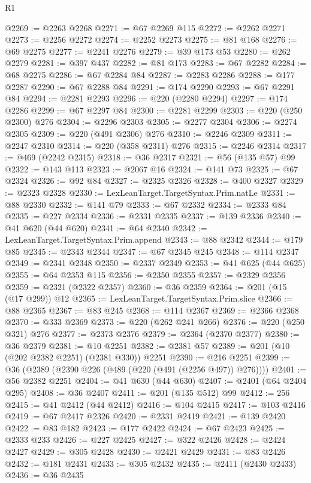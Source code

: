 \begin{lexlean}{R1}
\begin{coremodule}
{{{{{{{{{{{{{{{{{{{{{{{{{{{{{{{{{{{{{{{{@2269 := @2263 @2268
@2271 := @67 @2269 @115
@2272 := @2262 @2271
@2273 := @2256 @2272
@2274 := @2252 @2273
@2275 := @81 @168
@2276 := @69 @2275
@2277 := @2241 @2276
@2279 := @39 @173 @53
@2280 := @262 @2279
@2281 := @397 @437
@2282 := @81 @173
@2283 := @67 @2282
@2284 := @68 @2275
@2286 := @67 @2284 @84
@2287 := @2283 @2286
@2288 := @177 @2287
@2290 := @67 @2288 @84
@2291 := @174 @2290
@2293 := @67 @2291 @84
@2294 := @2281 @2293
@2296 := @220 (@2280 @2294)
@2297 := @174 @2286
@2299 := @67 @2297 @84
@2300 := @2281 @2299
@2303 := @220 (@250 @2300) @276
@2304 := @2296 @2303
@2305 := @2277 @2304
@2306 := @2274 @2305
@2309 := @220 (@491 @2306) @276
@2310 := @2246 @2309
@2311 := @2247 @2310
@2314 := @220 (@358 @2311) @276
@2315 := @2246 @2314
@2317 := @469 (@2242 @2315)
@2318 := @36 @2317
@2321 := @56 (@135 @57) @99
@2322 := @143 @113
@2323 := @2067 @16
@2324 := @141 @73
@2325 := @67 @2324
@2326 := @92 @84
@2327 := @2325 @2326
@2328 := @400 @2327
@2329 := @2323 @2328
@2330 := LexLeanTarget.TargetSyntax.Prim.natLe
@2331 := @88 @2330
@2332 := @141 @79
@2333 := @67 @2332
@2334 := @2333 @84
@2335 := @227 @2334
@2336 := @2331 @2335
@2337 := @139 @2336
@2340 := @41 @620 (@44 @620)
@2341 := @64 @2340
@2342 := LexLeanTarget.TargetSyntax.Prim.append
@2343 := @88 @2342
@2344 := @179 @85
@2345 := @2343 @2344
@2347 := @67 @2345 @245
@2348 := @114 @2347
@2349 := @2341 @2348
@2350 := @2337 @2349
@2353 := @41 @625 (@44 @625)
@2355 := @64 @2353 @115
@2356 := @2350 @2355
@2357 := @2329 @2356
@2359 := @2321 (@2322 @2357)
@2360 := @36 @2359
@2364 := @201 (@15 (@17 @299)) @12
@2365 := LexLeanTarget.TargetSyntax.Prim.slice
@2366 := @88 @2365
@2367 := @83 @245
@2368 := @114 @2367
@2369 := @2366 @2368
@2370 := @333 @2369
@2373 := @220 (@262 @241 @266)
@2376 := @220 (@250 @321) @276
@2377 := @2373 @2376
@2379 := @2364 (@2370 @2377)
@2380 := @36 @2379
@2381 := @10 @2251
@2382 := @2381 @57
@2389 := @201 (@10 (@202 @2382 @2251) (@2381 @330)) @2251
@2390 := @216 @2251
@2399 := @36 (@2389 (@2390 @226 (@489 (@220 (@491 (@2256 @497)) @276))))
@2401 := @56 @2382 @2251
@2404 := @41 @630 (@44 @630)
@2407 := @2401 (@64 @2404 @295)
@2408 := @36 @2407
@2411 := @201 (@135 @512) @99
@2412 := 256
@2415 := @41 @2412 (@44 @2412)
@2416 := @104 @2415
@2417 := @103 @2416
@2419 := @67 @2417 @2326
@2420 := @2331 @2419
@2421 := @139 @2420
@2422 := @83 @182
@2423 := @177 @2422
@2424 := @67 @2423
@2425 := @2333 @233
@2426 := @227 @2425
@2427 := @322 @2426
@2428 := @2424 @2427
@2429 := @305 @2428
@2430 := @2421 @2429
@2431 := @83 @2426
@2432 := @181 @2431
@2433 := @305 @2432
@2435 := @2411 (@2430 @2433)
@2436 := @36 @2435
}}}}}}}}}}}}}}}}}}}}}}}}}}}}}}}}}}}}}}}}
\end{coremodule}
\end{lexlean}
